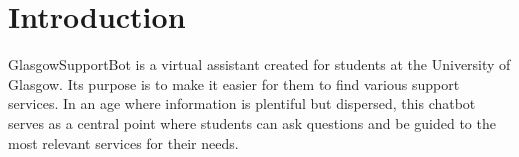 \documentclass{l4proj}
\begin{document}

%
\def\consentname {Mohammed Nader Al Haffar} %
\def\consentdate {3 March 2023} %
%
\educationalconsent


\tableofcontents

%
%
%
%
%
%
%
%
\chapter{Introduction}



GlasgowSupportBot is a virtual assistant created for students at the University of Glasgow. Its purpose is to make it easier for them to find various support services. In an age where information is plentiful but dispersed, this chatbot serves as a central point where students can ask questions and be guided to the most relevant services for their needs.
\end{document}
